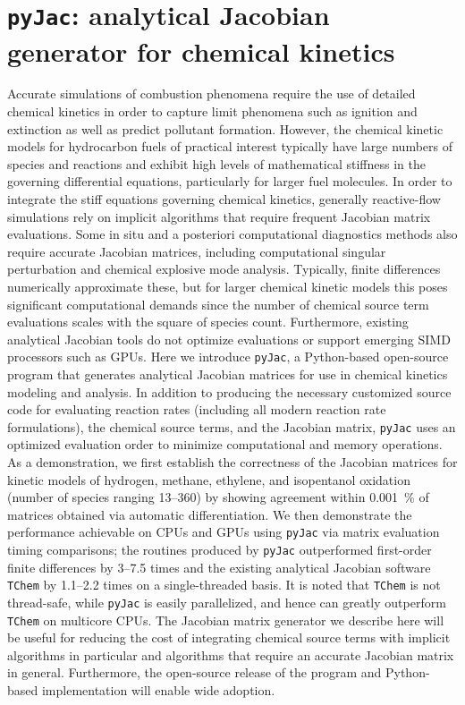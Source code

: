 \documentclass[a4paper,10pt]{article}
\begin{document}
\renewcommand*{\thesection}{\appendixname~\Alph{section}}

\section{\texttt{pyJac}: analytical Jacobian generator for chemical kinetics}
Accurate simulations of combustion phenomena require the use of detailed chemical kinetics in order to capture limit phenomena such as ignition and extinction as well as predict pollutant formation.
However, the chemical kinetic models for hydrocarbon fuels of practical interest typically have large numbers of species and reactions and exhibit high levels of mathematical stiffness in the governing differential equations, particularly for larger fuel molecules.
In order to integrate the stiff equations governing chemical kinetics, generally reactive-flow simulations rely on implicit algorithms that require frequent Jacobian matrix evaluations.
Some in situ and a posteriori computational diagnostics methods also require accurate Jacobian matrices, including computational singular perturbation and chemical explosive mode analysis.
Typically, finite differences numerically approximate these, but for larger chemical kinetic models this poses significant computational demands since the number of chemical source term evaluations scales with the square of species count.
Furthermore, existing analytical Jacobian tools do not optimize evaluations or support emerging SIMD processors such as GPUs.
Here we introduce \texttt{pyJac}, a Python-based open-source program that generates analytical Jacobian matrices for use in chemical kinetics modeling and analysis.
In addition to producing the necessary customized source code for evaluating reaction rates (including all modern reaction rate formulations), the chemical source terms, and the Jacobian matrix, \texttt{pyJac} uses an optimized evaluation order to minimize computational and memory operations.
As a demonstration, we first establish the correctness of the Jacobian matrices for kinetic models of hydrogen, methane, ethylene, and isopentanol oxidation (number of species ranging \numrange{13}{360}) by showing agreement within \SI{0.001}{\percent} of matrices obtained via automatic differentiation.
We then demonstrate the performance achievable on CPUs and GPUs using \texttt{pyJac} via matrix evaluation timing comparisons; the routines produced by \texttt{pyJac} outperformed first-order finite differences by \numrange{3}{7.5} times and the existing analytical Jacobian software \texttt{TChem} by \numrange{1.1}{2.2} times on a single-threaded basis.
It is noted that \texttt{TChem} is not thread-safe, while \texttt{pyJac} is easily parallelized, and hence can greatly outperform \texttt{TChem} on multicore CPUs.
The Jacobian matrix generator we describe here will be useful for reducing the cost of integrating chemical source terms with implicit algorithms in particular and algorithms that require an accurate Jacobian matrix in general.
Furthermore, the open-source release of the program and Python-based implementation will enable wide adoption.
\end{document}
